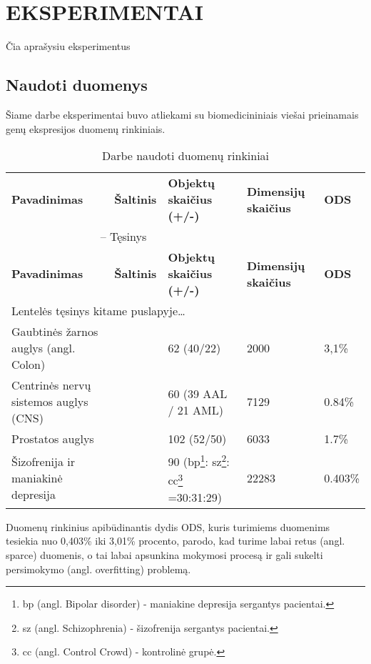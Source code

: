 \section{EKSPERIMENTAI}

Čia aprašysiu eksperimentus

\subsection{Naudoti duomenys}

Šiame darbe eksperimentai buvo atliekami su biomedicininiais viešai prieinamais
genų ekspresijos duomenų rinkiniais.
\begin{longtable}{|p{4cm}|p{1.4cm}|p{2.5cm}|p{1.6cm}|p{1cm}|}
\captionsetup{labelsep=period}
\caption{Darbe naudoti duomenų rinkiniai\label{table:datasets}}\\
\hline \hline
{\textbf{Pavadinimas}} &
{\textbf{Šaltinis}} &
{\textbf{Objektų skaičius (+/-)}}&
{\textbf{Dimensijų skaičius}}&
{\textbf{ODS}}\\
\hline
\endfirsthead
\multicolumn{3}{c}{{\tablename} \thetable{} -- Tęsinys} \\[0.5ex]
\hline \hline
{\textbf{Pavadinimas}} &
{\textbf{Šaltinis}} &
{\textbf{Objektų skaičius (+/-)}}&
{\textbf{Dimensijų skaičius}}&
{\textbf{ODS}}\\
\hline
\endhead
\multicolumn{3}{l}{{Lentelės tęsinys kitame puslapyje\ldots}} \\
\endfoot
\hline \hline
\endlastfoot
\hline 
Gaubtinės žarnos auglys (angl. Colon) 
& 
\cite{alon1999broad} 
& 
62 (40/22) 
& 
2000 
& 
3,1\% \\
\hline
Centrinės nervų sistemos auglys (CNS) 
& 
\cite{pomeroy2002prediction} 
& 
60 (39 AAL / 21 AML) 
& 
7129 
& 
0.84\% \\
\hline
Prostatos auglys 
& 
\cite{singh2002gene} 
& 
102 (52/50) 
& 
6033 
& 
1.7\% \\
\hline
Šizofrenija ir maniakinė depresija
&
\cite{altara}
&
90 (bp\footnote{bp (angl. Bipolar disorder) - maniakine depresija sergantys
pacientai.}:
sz\footnote{sz (angl. Schizophrenia) - šizofrenija sergantys pacientai.}:
cc\footnote{cc (angl. Control Crowd) - kontrolinė grupė.} =30:31:29)
&
22283
&
0.403\% \\
\hline
\end{longtable}
Duomenų rinkinius apibūdinantis dydis ODS, kuris turimiems duomenims tesiekia
nuo  0,403\% iki 3,01\% procento, parodo, kad turime labai retus (angl. sparce) duomenis, o tai labai apsunkina
mokymosi procesą ir gali sukelti persimokymo (angl. overfitting) problemą.

